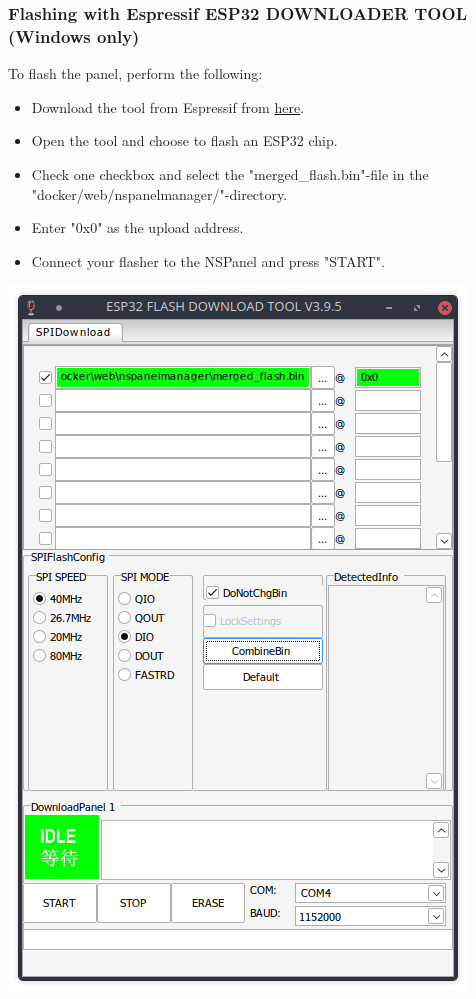 \documentclass[10pt]{article}
\begin{document}
    \subsubsection{Flashing with Espressif ESP32 DOWNLOADER TOOL (Windows only)}
    To flash the panel, perform the following:
    \begin{itemize}
      \item Download the tool from Espressif from \href{https://www.espressif.com/en/support/download/other-tools}{here}.
      \item Open the tool and choose to flash an ESP32 chip.
      \item Check one checkbox and select the "merged\_flash.bin"-file in the "docker/web/nspanelmanager/"-directory.
      \item Enter "0x0" as the upload address.
      \item Connect your flasher to the NSPanel and press "START".
    \end{itemize}
    \begin{center}
    \includegraphics[scale=0.4]{esp_flash_download_tool.png}
    \end{center}
\end{document}
